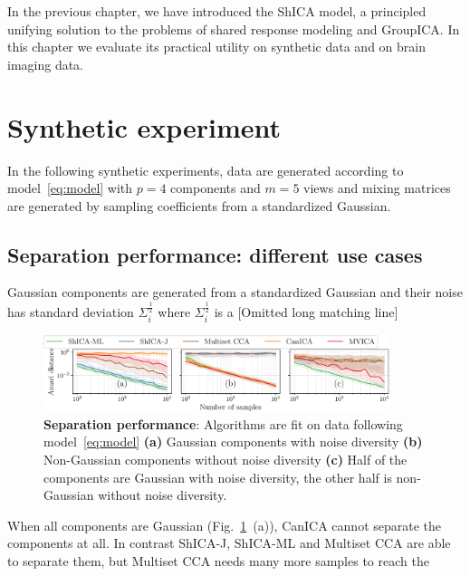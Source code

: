 In the previous chapter, we have introduced the ShICA model, a principled
unifying solution to the problems of shared response
modeling and GroupICA. In this chapter we evaluate its practical utility on
synthetic data and on brain imaging data.

\section{Synthetic experiment}
In the following synthetic experiments, data are generated according to model~\eqref{eq:model} with $p=4$ components and $m=5$ views and mixing matrices are generated by sampling coefficients from a standardized Gaussian.
\subsection{Separation performance: different use cases}
\label{sec:rotation}
Gaussian components are generated from a standardized Gaussian and their noise
has standard deviation $\Sigma_i^{\frac12}$ where $\Sigma_i^{\frac12}$ is a
[Omitted long matching line]
\begin{figure}
\centering
  \includegraphics[width=0.9\textwidth]{./figures/amvica/identifiability.pdf}
  \caption{\textbf{Separation performance}: Algorithms are fit on data following model~\ref{eq:model} \textbf{(a)} Gaussian components with noise diversity \textbf{(b)} Non-Gaussian components without noise diversity \textbf{(c)} Half of the components are Gaussian with noise diversity, the other half is non-Gaussian without noise diversity. 
  }
  \label{exp:rotation}
\end{figure}
When all components are Gaussian (Fig.~\ref{exp:rotation}~(a)), CanICA cannot
separate the components at all. In contrast ShICA-J, ShICA-ML and Multiset CCA
are able to separate them, but Multiset CCA needs many more samples to reach the
